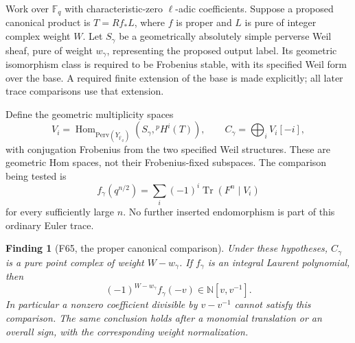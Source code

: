 \documentclass[11pt,a4paper]{article}
\newcommand{\fid}[1]{\textsf{#1}}\newcommand{\gate}[1]{\textsf{#1}}
\theoremstyle{named}\newtheorem{finding}{Finding}[section]
\theoremstyle{definition}\newtheorem{definition}[finding]{Definition}
\theoremstyle{remark}\newtheorem{remark}[finding]{Remark}
\begin{document}
Work over \(\mathbb F_q\) with characteristic-zero
\(\ell\)-adic coefficients. Suppose a proposed canonical
product is \(T=Rf_*L\), where \(f\) is proper and \(L\)
is pure of integer complex weight \(W\). Let \(S_\gamma\)
be a geometrically absolutely simple perverse Weil sheaf,
pure of weight \(w_\gamma\), representing the proposed
output label. Its geometric isomorphism class is required
to be Frobenius stable, with its specified Weil form over
the base. A required finite extension of the base is made
explicitly; all later trace comparisons use that extension.

Define the geometric multiplicity spaces
\[
 V_i=\operatorname{Hom}_{\mathrm{Perv}(Y_{\overline{\mathbb F}_q})}
             (S_\gamma,{}^pH^i(T)),
 \qquad C_\gamma=\bigoplus_i V_i[-i],
\]
with conjugation Frobenius from the two specified Weil
structures. These are geometric Hom spaces, not their
Frobenius-fixed subspaces. The comparison being tested is
\begin{equation}\label{eq:canonicalMultiplicityTrace}
 f_\gamma(q^{n/2})
     =\sum_i(-1)^i\operatorname{Tr}(F^n\mid V_i)
\end{equation}
for every sufficiently large \(n\). No further inserted
endomorphism is part of this ordinary Euler trace.

\begin{finding}[\fid{F65}, the proper canonical comparison]
\label{f:properCanonicalMultiplicity}
Under these hypotheses, \(C_\gamma\) is a pure point
complex of weight \(W-w_\gamma\). If \(f_\gamma\) is an
integral Laurent polynomial, then
\[
                 (-1)^{W-w_\gamma}f_\gamma(-v)
                    \in\mathbb N[v,v^{-1}].
\]
In particular a nonzero coefficient divisible by
\(v-v^{-1}\) cannot satisfy this comparison. The same
conclusion holds after a monomial translation or an
overall sign, with the corresponding weight normalization.
\end{finding}
\end{document}
